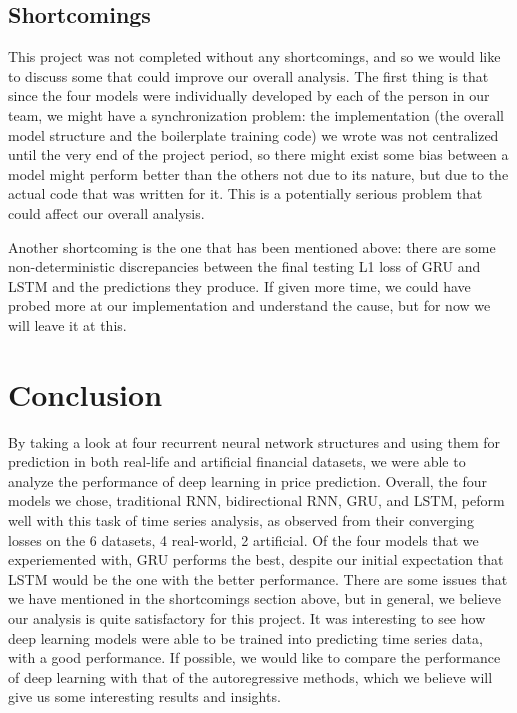 \documentclass[letterpaper, 10 pt, conference]{ieeeconf}  %
\begin{document}
    \subsection{Shortcomings}
        This project was not completed without any shortcomings, and so we would like to discuss some that could improve our overall analysis. The first thing is that since the four models were individually developed by each of the person in our team, we might have a synchronization problem: the implementation (the overall model structure and the boilerplate training code) we wrote was not centralized until the very end of the project period, so there might exist some bias between a model might perform better than the others not due to its nature, but due to the actual code that was written for it. This is a potentially serious problem that could affect our overall analysis.

        Another shortcoming is the one that has been mentioned above: there are some non-deterministic discrepancies between the final testing L1 loss of GRU and LSTM and the predictions they produce. If given more time, we could have probed more at our implementation and understand the cause, but for now we will leave it at this.  
        

\section{Conclusion}
    By taking a look at four recurrent neural network structures and using them for prediction in both real-life and artificial financial datasets, we were able to analyze the performance of deep learning in price prediction. Overall, the four models we chose, traditional RNN, bidirectional RNN, GRU, and LSTM, peform well with this task of time series analysis, as observed from their converging losses on the 6 datasets, 4 real-world, 2 artificial. Of the four models that we experiemented with, GRU performs the best, despite our initial expectation that LSTM would be the one with the better performance. There are some issues that we have mentioned in the shortcomings section above, but in general, we believe our analysis is quite satisfactory for this project. It was interesting to see how deep learning models were able to be trained into predicting time series data, with a good performance. If possible, we would like to compare the performance of deep learning with that of the autoregressive methods, which we believe will give us some interesting results and insights.
\end{document}
